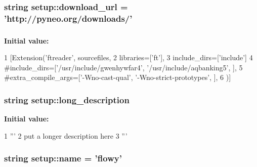 \hypertarget{namespacesetup_a38a3b3d91352a32f3d426e75d0a68314}{
\subsubsection[{download\-\_\-url}]{\setlength{\rightskip}{0pt plus 5cm}string {\bf setup\-::download\-\_\-url} = 'http\-://pyneo.\-org/downloads/'}}\label{namespacesetup_a38a3b3d91352a32f3d426e75d0a68314}
\hypertarget{namespacesetup_adf64e6d585b775ff05a5c0d07dc5a78f}{
\subsubsection[{ext\-\_\-modules}]{}}\label{namespacesetup_adf64e6d585b775ff05a5c0d07dc5a78f}
{\bfseries \-Initial value\-:}
\begin{DoxyCode}
1 [Extension('ftreader', sourcefiles,
2     libraries=['ft'],
3     include_dirs=['include']
4     #include_dirs=['/usr/include/gwenhywfar4', '/usr/include/aqbanking5', ],
5     #extra_compile_args=['-Wno-cast-qual', '-Wno-strict-prototypes', ],
6     )]
\end{DoxyCode}
\hypertarget{namespacesetup_a718ebc1d14d8aaf7bf72092d219f19fa}{
\subsubsection[{long\-\_\-description}]{\setlength{\rightskip}{0pt plus 5cm}string {\bf setup\-::long\-\_\-description}}}\label{namespacesetup_a718ebc1d14d8aaf7bf72092d219f19fa}
{\bfseries \-Initial value\-:}
\begin{DoxyCode}
1 '''
2 put a longer description here
3 '''
\end{DoxyCode}
\hypertarget{namespacesetup_a4b28e5b21e957c451ff3aa28f58c6383}{
\subsubsection[{name}]{\setlength{\rightskip}{0pt plus 5cm}string {\bf setup\-::name} = 'flowy'}}\label{namespacesetup_a4b28e5b21e957c451ff3aa28f58c6383}
